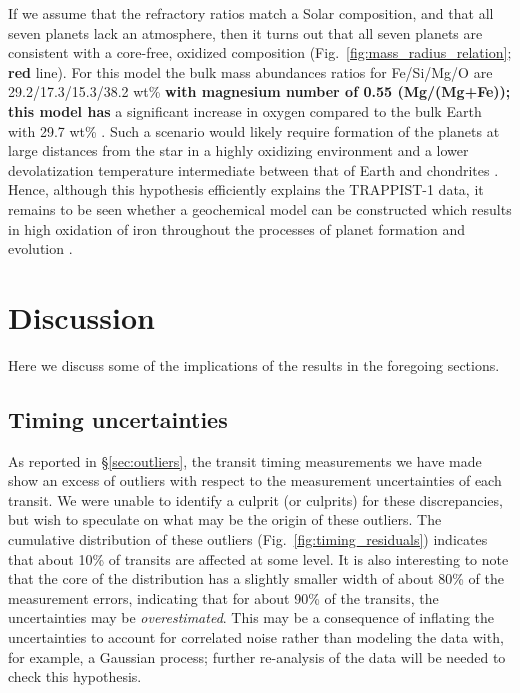 \documentclass[twocolumn]{aastex63}
\begin{document}
If we assume that the refractory ratios match a Solar composition, and that all seven planets lack an atmosphere, then it turns out that all seven planets are consistent with a core-free, oxidized composition (Fig.\ \ref{fig:mass_radius_relation}; \textbf{red} line).  For this model the bulk mass abundances ratios for Fe/Si/Mg/O are 29.2/17.3/15.3/38.2 wt\% \textbf{with magnesium number of 0.55 (Mg/(Mg+Fe)); this model has } a significant increase in oxygen compared to the bulk Earth with 29.7 wt\% \citep{McDonough2014}.
Such a scenario would likely require formation of the planets at large distances from the star in a highly oxidizing environment \citep{ElkinsTanton2008} and a lower  devolatization temperature intermediate between that of Earth and chondrites \citep{Wang2019}.  Hence, although this hypothesis efficiently explains the TRAPPIST-1 data, it remains to be seen whether a geochemical model can be constructed which results in high oxidation of iron throughout the processes of planet formation and evolution \textbf{\citep{Kite2020}}.

\section{Discussion} \label{sec:discussion}

Here we discuss some of the implications of the results in the foregoing sections.

\subsection{Timing uncertainties}

As reported in \S \ref{sec:outliers}, the transit timing measurements we have made show an excess of outliers with respect to the measurement uncertainties of each transit.  We were unable to identify a culprit (or culprits) for these discrepancies, but wish to speculate on what may be the origin of these outliers.  The cumulative distribution of these outliers (Fig.\ \ref{fig:timing_residuals}) indicates that about 10\% of transits
are affected at some level.  It is also interesting to note that the core of the distribution has a slightly smaller width of about 80\% of the measurement errors, indicating that for about 90\% of the transits, the uncertainties may be \emph{overestimated}.  This may be a consequence of inflating the uncertainties to account for correlated noise rather than modeling the data with, for example, a Gaussian process;  further re-analysis of the data will be needed to check this hypothesis.
\end{document}
